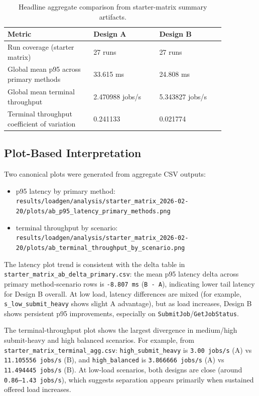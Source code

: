 \documentclass[11pt]{article}
\begin{document}
\begin{table}[H]
\centering
\caption{Headline aggregate comparison from starter-matrix summary artifacts.}
\label{tab:headline-aggregate}
\begin{tabular}{p{0.34\linewidth} p{0.26\linewidth} p{0.26\linewidth}}
\toprule
\textbf{Metric} & \textbf{Design A} & \textbf{Design B} \\
\midrule
Run coverage (starter matrix) & 27 runs & 27 runs \\
Global mean p95 across primary methods & 33.615 ms & 24.808 ms \\
Global mean terminal throughput & 2.470988 jobs/s & 5.343827 jobs/s \\
Terminal throughput coefficient of variation & 0.241133 & 0.021774 \\
\bottomrule
\end{tabular}
\end{table}

\subsection{Plot-Based Interpretation}
Two canonical plots were generated from aggregate CSV outputs:
\begin{itemize}
    \item p95 latency by primary method: \texttt{results/loadgen/analysis/starter\_matrix\_2026-02-20/plots/ab\_p95\_latency\_primary\_methods.png}
    \item terminal throughput by scenario: \texttt{results/loadgen/analysis/starter\_matrix\_2026-02-20/plots/ab\_terminal\_throughput\_by\_scenario.png}
\end{itemize}

The latency plot trend is consistent with the delta table in \texttt{starter\_matrix\_ab\_delta\_primary.csv}: the mean p95 latency delta across primary method-scenario rows is \texttt{-8.807 ms} (\texttt{B - A}), indicating lower tail latency for Design B overall.
At low load, latency differences are mixed (for example, \texttt{s\_low\_submit\_heavy} shows slight A advantage), but as load increases, Design B shows persistent p95 improvements, especially on \texttt{SubmitJob}/\texttt{GetJobStatus}.

The terminal-throughput plot shows the largest divergence in medium/high submit-heavy and high balanced scenarios.
For example, from \texttt{starter\_matrix\_terminal\_agg.csv}: \texttt{high\_submit\_heavy} is \texttt{3.00 jobs/s} (A) vs \texttt{11.105556 jobs/s} (B), and \texttt{high\_balanced} is \texttt{3.866666 jobs/s} (A) vs \texttt{11.494445 jobs/s} (B).
At low-load scenarios, both designs are close (around \texttt{0.86--1.43 jobs/s}), which suggests separation appears primarily when sustained offered load increases.
\end{document}
